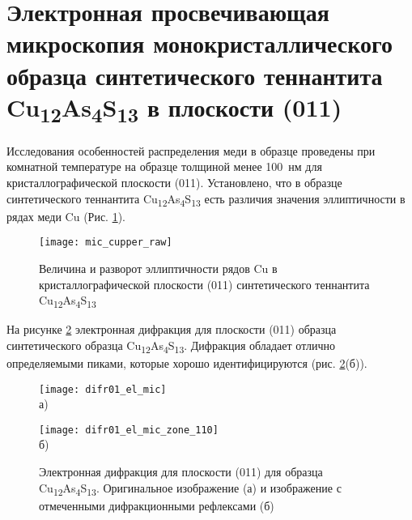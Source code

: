 \section{Электронная просвечивающая микроскопия монокристаллического образца синтетического теннантита Cu\textsubscript{12}As\textsubscript{4}S\textsubscript{13} в плоскости (011) } \label{sect3_2}

Исследования особенностей распределения меди в образце проведены при комнатной температуре на образце толщиной менее 100~нм для кристаллографической плоскости (011).
Установлено, что в образце синтетического теннантита Cu\textsubscript{12}As\textsubscript{4}S\textsubscript{13} есть различия значения эллиптичности в рядах меди Cu (Рис. \ref{img:mic}).

\begin{figure}[h!]
  \begin{minipage}[ht]{0.9\linewidth}\centering
    \texttt{[image: mic\_cupper\_raw]}
  \end{minipage}

      \caption[Величина и разворот эллиптичности рядов Cu в кристаллографической плоскости (011) синтетического теннантита Cu\textsubscript{12}As\textsubscript{4}S\textsubscript{13}]{Величина и разворот эллиптичности рядов Cu в кристаллографической плоскости (011) синтетического теннантита Cu\textsubscript{12}As\textsubscript{4}S\textsubscript{13}}
    \label{img:mic}
\end{figure}


На рисунке \ref{img:mic2} электронная дифракция для плоскости (011) образца синтетического образца Cu\textsubscript{12}As\textsubscript{4}S\textsubscript{13}.
Дифракция обладает отлично определяемыми пиками, которые хорошо идентифицируются (рис. \ref{img:mic2}(б)).

\begin{figure}[ph!]
\centering
  \begin{minipage}[ht]{0.7\linewidth}\centering
    \texttt{[image: difr01\_el\_mic]} \\ а)
  \end{minipage}
  \vfill
  \begin{minipage}[ht]{0.7\linewidth}\centering
    \texttt{[image: difr01\_el\_mic\_zone\_110]} \\ б)
  \end{minipage}
  \caption[Электронная дифракция для плоскости (011) для образца Cu\textsubscript{12}As\textsubscript{4}S\textsubscript{13}. Оригинальное изображение (а) и изображение с отмеченными дифракционными рефлексами (б)]{Электронная дифракция для плоскости (011) для образца Cu\textsubscript{12}As\textsubscript{4}S\textsubscript{13}. Оригинальное изображение (а) и изображение с отмеченными дифракционными рефлексами (б)}
    \label{img:mic2}
\end{figure}

